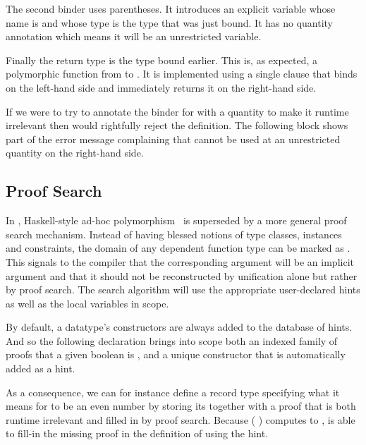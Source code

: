 The second binder uses parentheses. It introduces an explicit variable whose name
is  and whose type is the type  that was just bound. It has
no quantity annotation which means it will be an unrestricted variable.

Finally the return type is the type  bound earlier. This is, as expected,
a polymorphic function from  to . It is implemented using
a single clause that binds  on the left-hand side and immediately returns
it on the right-hand side.


If we were to try to annotate the binder for  with a 
quantity to make it runtime irrelevant then \idris{} would
rightfully reject the definition.
%
The following  block shows part of the error message complaining
that  cannot be used at an unrestricted quantity on the right-hand side.




\subsection{Proof Search}\label{sec:proofsearch}

In \idris{}, Haskell-style ad-hoc polymorphism~\cite{DBLP:conf/popl/WadlerB89}
is superseded by a more general proof search mechanism.
%
Instead of having blessed notions of type classes, instances and constraints,
the domain of any dependent function type can be marked as .
%
This signals to the compiler that the corresponding argument will be an implicit
argument and that it should not be reconstructed by unification alone but rather by
proof search.
%
The search algorithm will use the appropriate user-declared hints as well as
the local variables in scope.

By default, a datatype's constructors are always added to the database of hints.
And so the following declaration brings into scope both an indexed family
 of proofs that a given boolean is , and a unique
constructor  that is automatically added as a hint.


As a consequence, we can for instance define a record type specifying what it
means for  to be an even number by storing its 
together with a proof that is both runtime irrelevant and filled in by proof search.
%
Because ( \IdrisFunction{*}  \IdrisFunction{==} )
computes to , \idris{} is able to fill-in the missing proof in the
definition of  using the  hint.

